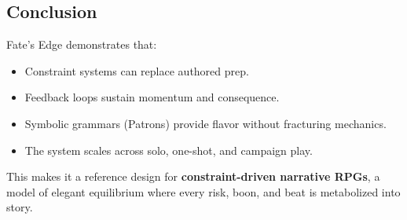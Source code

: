 \subsection{Conclusion}

Fate’s Edge demonstrates that:
\begin{itemize}
  \item Constraint systems can replace authored prep.  
  \item Feedback loops sustain momentum and consequence.  
  \item Symbolic grammars (Patrons) provide flavor without fracturing mechanics.  
  \item The system scales across solo, one-shot, and campaign play.  
\end{itemize}

This makes it a reference design for \textbf{constraint-driven narrative RPGs}, a model of elegant equilibrium where every risk, boon, and beat is metabolized into story.
